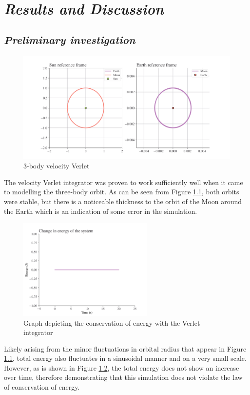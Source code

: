 \documentclass[12pt, english]{report}
\begin{document}
%

\chapter{\textsl{Results and Discussion}}
\section{\textsl{Preliminary investigation}}
\begin{figure}[ht]
    \centering
    \includegraphics[width=1.0\textwidth]{graphics/3b_verlet.png}
    \caption{3-body velocity Verlet}
    \label{fig:3b_verlet}
\end{figure}

\normalsize{\noindent The velocity Verlet integrator was proven to work sufficiently well when it came to modelling the three-body orbit. As can be seen from Figure \ref{fig:3b_verlet}, both orbits were stable, but there is a noticeable thickness to the orbit of the Moon around the Earth which is an indication of some error in the simulation.
\begin{figure}[ht]
    \centering
    \includegraphics[width=0.6\textwidth]{graphics/3b_conservation.png}
    \caption{Graph depicting the conservation of energy with the Verlet integrator}
    \label{fig:3b_conservation}
\end{figure}

Likely arising from the minor fluctuations in orbital radius that appear in Figure \ref{fig:3b_verlet}, total energy also fluctuates in a sinusoidal manner and on a very small scale. However, as is shown in Figure \ref{fig:3b_conservation}, the total energy does not show an increase over time, therefore demonstrating that this simulation does not violate the law of conservation of energy.}
\end{document}
